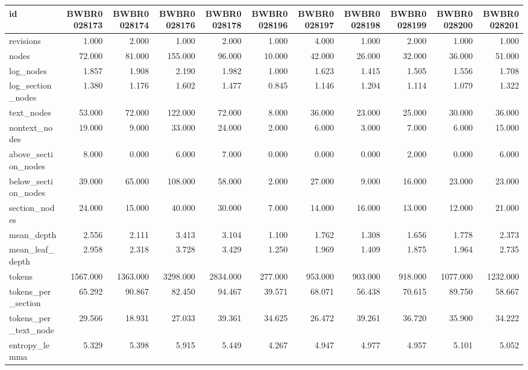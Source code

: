 \begin{tabular}{lrrrrrrrrrr}
\toprule
id & BWBR0028173 & BWBR0028174 & BWBR0028176 & BWBR0028178 & BWBR0028196 & BWBR0028197 & BWBR0028198 & BWBR0028199 & BWBR0028200 & BWBR0028201 \\
\midrule
revisions & 1.000 & 2.000 & 1.000 & 2.000 & 1.000 & 4.000 & 1.000 & 2.000 & 1.000 & 1.000 \\
\cline{1-11}
nodes & 72.000 & 81.000 & 155.000 & 96.000 & 10.000 & 42.000 & 26.000 & 32.000 & 36.000 & 51.000 \\
\cline{1-11}
log\_nodes & 1.857 & 1.908 & 2.190 & 1.982 & 1.000 & 1.623 & 1.415 & 1.505 & 1.556 & 1.708 \\
\cline{1-11}
log\_section\_nodes & 1.380 & 1.176 & 1.602 & 1.477 & 0.845 & 1.146 & 1.204 & 1.114 & 1.079 & 1.322 \\
\cline{1-11}
text\_nodes & 53.000 & 72.000 & 122.000 & 72.000 & 8.000 & 36.000 & 23.000 & 25.000 & 30.000 & 36.000 \\
\cline{1-11}
nontext\_nodes & 19.000 & 9.000 & 33.000 & 24.000 & 2.000 & 6.000 & 3.000 & 7.000 & 6.000 & 15.000 \\
\cline{1-11}
above\_section\_nodes & 8.000 & 0.000 & 6.000 & 7.000 & 0.000 & 0.000 & 0.000 & 2.000 & 0.000 & 6.000 \\
\cline{1-11}
below\_section\_nodes & 39.000 & 65.000 & 108.000 & 58.000 & 2.000 & 27.000 & 9.000 & 16.000 & 23.000 & 23.000 \\
\cline{1-11}
section\_nodes & 24.000 & 15.000 & 40.000 & 30.000 & 7.000 & 14.000 & 16.000 & 13.000 & 12.000 & 21.000 \\
\cline{1-11}
mean\_depth & 2.556 & 2.111 & 3.413 & 3.104 & 1.100 & 1.762 & 1.308 & 1.656 & 1.778 & 2.373 \\
\cline{1-11}
mean\_leaf\_depth & 2.958 & 2.318 & 3.728 & 3.429 & 1.250 & 1.969 & 1.409 & 1.875 & 1.964 & 2.735 \\
\cline{1-11}
tokens & 1567.000 & 1363.000 & 3298.000 & 2834.000 & 277.000 & 953.000 & 903.000 & 918.000 & 1077.000 & 1232.000 \\
\cline{1-11}
tokens\_per\_section & 65.292 & 90.867 & 82.450 & 94.467 & 39.571 & 68.071 & 56.438 & 70.615 & 89.750 & 58.667 \\
\cline{1-11}
tokens\_per\_text\_node & 29.566 & 18.931 & 27.033 & 39.361 & 34.625 & 26.472 & 39.261 & 36.720 & 35.900 & 34.222 \\
\cline{1-11}
entropy\_lemma & 5.329 & 5.398 & 5.915 & 5.449 & 4.267 & 4.947 & 4.977 & 4.957 & 5.101 & 5.052 \\

\end{tabular}
